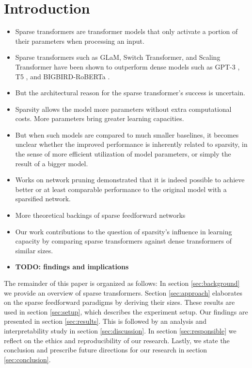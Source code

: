 \section{Introduction}
\label{sec:intro}
\begin{itemize}
    \item Sparse transformers are transformer models that only activate a portion of their parameters when processing an input.
    \item Sparse transformers such as GLaM, Switch Transformer, and Scaling Transformer have been shown to outperform dense models such as GPT-3 \cite{du_glam_2022}, T5 \cite{fedus_switch_2022}, and BIGBIRD-RoBERTa \cite{jaszczur_sparse_2021}.
    \item But the architectural reason for the sparse transformer's success is uncertain.
    \item Sparsity allows the model more parameters without extra computational costs. More parameters bring greater learning capacities.
    \item But when such models are compared to much smaller baselines, it becomes unclear whether the improved performance is inherently related to sparsity, in the sense of more efficient utilization of model parameters, or simply the result of a bigger model.
    \item Works on network pruning demonstrated that it is indeed possible to achieve better \cite{balderas_optimizing_2024} or at least comparable performance \cite{lecun_optimal_1989} to the original model with a sparsified network.
    \item More theoretical backings of sparse feedforward networks \cite{csordas_approximating_2023,baykal_theoretical_2022}
    \item Our work contributions to the question of sparsity's influence in learning capacity by comparing sparse transformers against dense transformers of similar sizes.
    \item \textbf{TODO: findings and implications}

\end{itemize}

The remainder of this paper is organized as follows: In section \ref{sec:background} we provide an overview of sparse transformers. Section \ref{sec:approach} elaborates on the sparse feedforward paradigms by deriving their sizes. These results are used in section \ref{sec:setup}, which describes the experiment setup. Our findings are presented in section \ref{sec:results}. This is followed by an analysis and interpretability study in section \ref{sec:discussion}. In section \ref{sec:responsible} we reflect on the ethics and reproducibility of our research. Lastly, we state the conclusion and prescribe future directions for our research in section \ref{sec:conclusion}.

